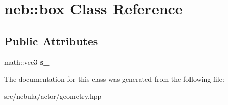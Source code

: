 \hypertarget{classneb_1_1box}{\section{neb\-:\-:box \-Class \-Reference}
\label{classneb_1_1box}
}
\subsection*{\-Public \-Attributes}
\begin{DoxyCompactItemize}
\item 
\hypertarget{classneb_1_1box_a7c1a37ac522ae516df9e6058a756c7d3}{math\-::vec3 {\bfseries s\-\_\-}}\label{classneb_1_1box_a7c1a37ac522ae516df9e6058a756c7d3}

\end{DoxyCompactItemize}


\-The documentation for this class was generated from the following file\-:\begin{DoxyCompactItemize}
\item 
src/nebula/actor/geometry.\-hpp\end{DoxyCompactItemize}
